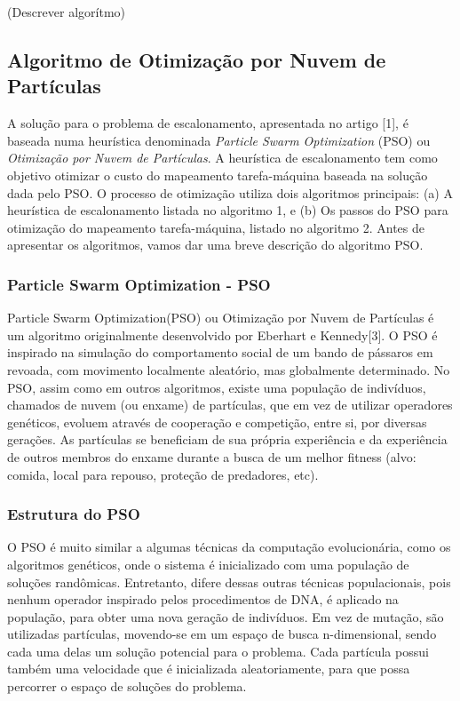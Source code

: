 \documentclass[a4paper,10pt]{article}
\begin{document}
(Descrever algorítmo)

\subsection{Algoritmo de Otimização por Nuvem de Partículas}

A solução para o problema de escalonamento, apresentada no artigo [1], é baseada numa heurística 
denominada \emph{Particle Swarm Optimization} (PSO) ou \emph{Otimização por Nuvem de Partículas}. A heurística de 
escalonamento tem como objetivo otimizar 
o custo do mapeamento tarefa-máquina baseada na solução dada pelo PSO. O processo de otimização utiliza 
dois algoritmos principais: (a) A heurística de escalonamento listada no algoritmo 1, e (b) Os passos do PSO 
para otimização do mapeamento tarefa-máquina, listado no algoritmo 2. Antes de apresentar os algoritmos, vamos 
dar uma breve descrição do algoritmo PSO.

\subsubsection{Particle Swarm Optimization - PSO}

Particle Swarm Optimization(PSO) ou Otimização por Nuvem de Partículas é um algoritmo originalmente 
desenvolvido por Eberhart e Kennedy[3]. O PSO é inspirado na simulação do comportamento social de um 
bando de pássaros em revoada, com movimento localmente aleatório, mas globalmente determinado. No PSO, 
assim como em outros algoritmos, existe uma população de indivíduos, chamados de nuvem (ou enxame) de 
partículas, que em vez de utilizar operadores genéticos, evoluem através de cooperação e competição, entre si, 
por diversas gerações. As partículas se beneficiam de sua própria experiência e da experiência de outros membros 
do enxame durante a busca de um melhor fitness (alvo: comida, local para repouso, proteção de predadores, etc).

\subsubsection{Estrutura do PSO}

O PSO é muito similar a algumas técnicas da computação evolucionária, como os algoritmos genéticos, onde o 
sistema é inicializado com uma população de soluções randômicas. Entretanto, difere dessas outras técnicas 
populacionais, pois nenhum operador inspirado pelos procedimentos de DNA, é aplicado na população, para obter 
uma nova geração de indivíduos. Em vez de mutação, são utilizadas partículas, movendo-se em um espaço de busca 
n-dimensional, sendo cada uma delas um solução potencial para o problema. Cada partícula possui também uma 
velocidade que é inicializada aleatoriamente, para que possa percorrer o espaço de soluções do problema.
\end{document}
